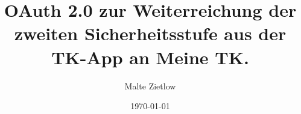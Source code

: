 \documentclass[12pt,twoside,bind,ams,a4paper]{hepthesis}
\author{Malte Zietlow}
\title{OAuth 2.0 zur Weiterreichung der zweiten Sicherheitsstufe aus der TK-App
an Meine TK.}
\date{\today}
\begin{document}
\renewcommand*\chapterheadstartvskip{\vspace*{-2cm}}
\renewcommand*{\figurename}{Abb.}
\renewcommand*{\figureautorefname}{Abb.}
\renewcommand*{\tablename}{Tab.}
\renewcommand*{\tableautorefname}{Tab.}
\renewcommand*{\chapterautorefname}{Kapitel}
\renewcommand*{\sectionautorefname}{Kapitel}
\renewcommand*{\subsectionautorefname}{Kapitel}
\renewcommand*{\equationautorefname}{Gl.}

\begin{frontmatter}

\end{frontmatter}
\setlength{\evensidemargin}{0cm}	   %
\setlength{\oddsidemargin}{0cm}		   %
\begin{mainmatter}

\end{mainmatter}

\begin{appendices}

\end{appendices}

\begin{backmatter}

\end{backmatter}
\end{document}
